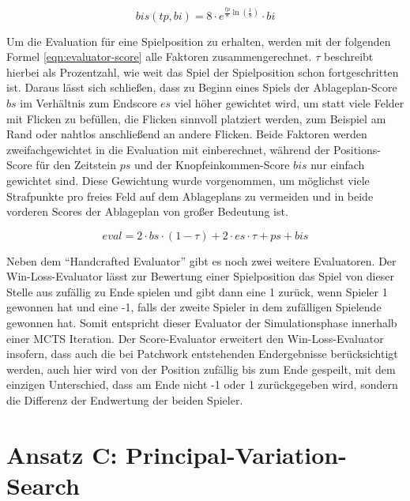 \begin{equation}
    \label{eqn:button-income-score}
    bis(tp, bi) = 8 \cdot e^{\frac{tp}{8}\ln\left(\frac{1}{8}\right)} \cdot bi
\end{equation}

Um die Evaluation für eine Spielposition zu erhalten, werden mit der folgenden Formel \ref{eqn:evaluator-score} alle Faktoren zusammengerechnet. $\tau$ beschreibt hierbei als Prozentzahl, wie weit das Spiel der Spielposition schon fortgeschritten ist. Daraus lässt sich schließen, dass zu Beginn eines Spiels der Ablageplan-Score $bs$ im Verhältnis zum Endscore $es$ viel höher gewichtet wird, um statt viele Felder mit Flicken zu befüllen, die Flicken sinnvoll platziert werden, zum Beispiel am Rand oder nahtlos anschließend an andere Flicken. Beide Faktoren werden zweifachgewichtet in die Evaluation mit einberechnet, während der Positions-Score für den Zeitstein $ps$ und der Knopfeinkommen-Score $bis$ nur einfach gewichtet sind. Diese Gewichtung wurde vorgenommen, um möglichst viele Strafpunkte pro freies Feld auf dem Ablageplans zu vermeiden und in beide vorderen Scores der Ablageplan von großer Bedeutung ist.

\begin{equation}
    \label{eqn:evaluator-score}
    eval = 2 \cdot bs \cdot (1 - \tau) + 2 \cdot es \cdot \tau + ps + bis
\end{equation}

Neben dem \enquote{Handcrafted Evaluator} gibt es noch zwei weitere Evaluatoren. Der Win-Loss-Evaluator lässt zur Bewertung einer Spielposition das Spiel von dieser Stelle aus zufällig zu Ende spielen und gibt dann eine 1 zurück, wenn Spieler 1 gewonnen hat und eine -1, falls der zweite Spieler in dem zufälligen Spielende gewonnen hat. Somit entspricht dieser Evaluator der Simulationsphase innerhalb einer \ac{MCTS} Iteration. Der Score-Evaluator erweitert den Win-Loss-Evaluator insofern, dass auch die bei Patchwork entstehenden Endergebnisse berücksichtigt werden, \dash auch hier wird von der Position zufällig bis zum Ende gespeilt, mit dem einzigen Unterschied, dass am Ende nicht -1 oder 1 zurückgegeben wird, sondern die Differenz der Endwertung der beiden Spieler.

\pagebreak

\section{Ansatz C: Principal-Variation-Search}
\label{section:erstellung-ansatz-b}

